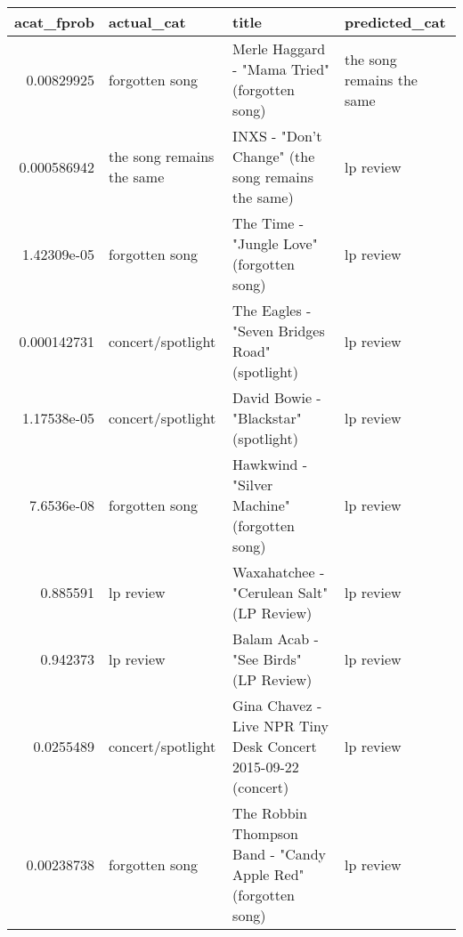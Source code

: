 \documentclass[letterpaper,10pt]{article}
\begin{document}
\begin{table}[H]
 \begin{adjustbox}{max width=\linewidth}
\begin{tabular}{rlll}
\hline
   acat\_fprob & actual\_cat                & title                                                                                                        & predicted\_cat             \\
\hline
  0.00829925  & forgotten song            & Merle Haggard - "Mama Tried" (forgotten song)                                                                & the song remains the same \\
  0.000586942 & the song remains the same & INXS - "Don't Change" (the song remains the same)                                                            & lp review                 \\
  1.42309e-05 & forgotten song            & The Time - "Jungle Love" (forgotten song)                                                                    & lp review                 \\
  0.000142731 & concert/spotlight         & The Eagles - "Seven Bridges Road" (spotlight)                                                                & lp review                 \\
  1.17538e-05 & concert/spotlight         & David Bowie - "Blackstar" (spotlight)                                                                        & lp review                 \\
  7.6536e-08  & forgotten song            & Hawkwind - "Silver Machine" (forgotten song)                                                                 & lp review                 \\
  0.885591    & lp review                 & Waxahatchee - "Cerulean Salt" (LP Review)                                                                    & lp review                 \\
  0.942373    & lp review                 & Balam Acab - "See Birds" (LP Review)                                                                         & lp review                 \\
  0.0255489   & concert/spotlight         & Gina Chavez - Live NPR Tiny Desk Concert 2015-09-22 (concert)                                                & lp review                 \\
  0.00238738  & forgotten song            & The Robbin Thompson Band - "Candy Apple Red" (forgotten song)                                                & lp review                 \\

\end{tabular}
\end{adjustbox}
\end{table}
\end{document}
